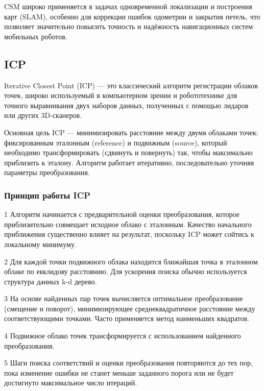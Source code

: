 CSM широко применяется в задачах одновременной локализации и построения карт (SLAM), особенно для коррекции ошибок одометрии и закрытия петель, что позволяет значительно повысить точность и надёжность навигационных систем мобильных роботов.


\subsection{ICP}

Iterative Closest Point (ICP) — это классический алгоритм регистрации облаков точек, широко используемый в компьютерном зрении и робототехнике для точного выравнивания двух наборов данных, полученных с помощью лидаров или других 3D-сканеров.

Основная цель ICP — минимизировать расстояние между двумя облаками точек: фиксированным эталонным (reference) и подвижным (source), который необходимо трансформировать (сдвинуть и повернуть) так, чтобы максимально приблизить к эталону. Алгоритм работает итеративно, последовательно уточняя параметры преобразования.

\subsubsection{Принцип работы ICP}

1 Алгоритм начинается с предварительной оценки преобразования, которое приблизительно совмещает исходное облако с эталонным. Качество начального приближения существенно влияет на результат, поскольку ICP может сойтись к локальному минимуму.
    
2 Для каждой точки подвижного облака находится ближайшая точка в эталонном облаке по евклидову расстоянию. Для ускорения поиска обычно используется структура данных k-d дерево.
    
3 На основе найденных пар точек вычисляется оптимальное преобразование (смещение и поворот), минимизирующее среднеквадратичное расстояние между соответствующими точками. Часто применяется метод наименьших квадратов.
    
4 Подвижное облако точек трансформируется с использованием найденного преобразования.
    
5 Шаги поиска соответствий и оценки преобразования повторяются до тех пор, пока изменение ошибки не станет меньше заданного порога или не будет достигнуто максимальное число итераций.

